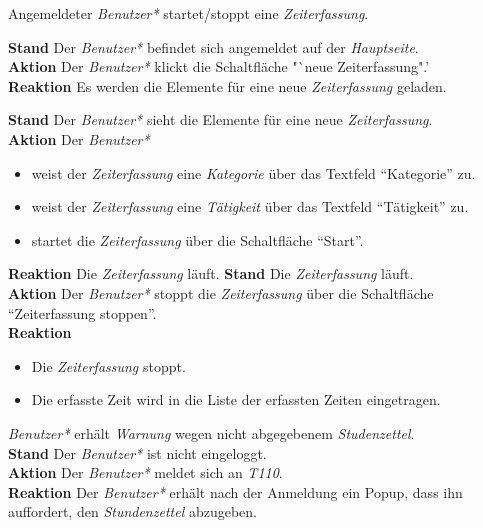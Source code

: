 \begin{requirements}
\begin{requirements}
	\end{requirements}
	 Angemeldeter \emph{Benutzer*} startet/stoppt eine \emph{Zeiterfassung}.
	\begin{requirements}
            \textbf{Stand} Der \emph{Benutzer*} befindet sich angemeldet auf der \emph{Hauptseite}. \\
            \textbf{Aktion} Der \emph{Benutzer*} klickt die Schaltfläche "`neue Zeiterfassung".' \\
            \textbf{Reaktion} Es werden die Elemente für eine neue \emph{Zeiterfassung} geladen.
            \item
                \textbf{Stand} Der \emph{Benutzer*} sieht die Elemente für eine neue \emph{Zeiterfassung}. \\
                \textbf{Aktion} Der \emph{Benutzer*}
                    \begin{itemize}
                        \item weist der \emph{Zeiterfassung} eine \emph{Kategorie} über das Textfeld "`Kategorie"' zu.
                        \item weist der \emph{Zeiterfassung} eine \emph{Tätigkeit} über das Textfeld "`Tätigkeit"' zu.
                        \item startet die \emph{Zeiterfassung} über die Schaltfläche "`Start"'.
                    \end{itemize}
                \textbf{Reaktion} Die \emph{Zeiterfassung} läuft.
            \textbf{Stand} Die \emph{Zeiterfassung} läuft. \\
            \textbf{Aktion} Der \emph{Benutzer*} stoppt die \emph{Zeiterfassung} über die Schaltfläche "`Zeiterfassung stoppen"'. \\
            \textbf{Reaktion}
                \begin{itemize}
                    \item Die \emph{Zeiterfassung} stoppt.
                    \item Die erfasste Zeit wird in die Liste der erfassten Zeiten eingetragen.
                \end{itemize}
	\end{requirements}


	 \emph{Benutzer*} erhält \emph{Warnung} wegen nicht abgegebenem \emph{Studenzettel}. \\
        \textbf{Stand} Der \emph{Benutzer*} ist nicht eingeloggt. \\
        \textbf{Aktion} Der \emph{Benutzer*} meldet sich an \emph{T110}. \\
        \textbf{Reaktion} Der \emph{Benutzer*} erhält nach der Anmeldung ein Popup, dass ihn auffordert, den \emph{Stundenzettel} abzugeben.


\end{requirements}
